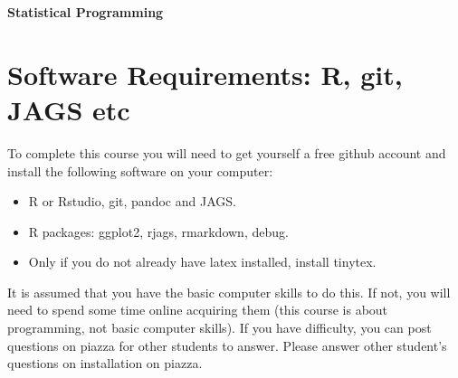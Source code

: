 \documentclass[10pt] {article}
\theoremstyle{definition}
\begin{document}
\centerline{\huge \bf Statistical Programming}

\tableofcontents


\section{Software Requirements: R, git, JAGS etc \label{sec:software}}

To complete this course you will need to get yourself a free github account and install the following software on your computer: 
\begin{itemize}
\item R or Rstudio, git, pandoc and JAGS.
\item R packages: ggplot2, rjags, rmarkdown, debug.
\item Only if you do not already have latex installed, install tinytex. 
\end{itemize}
It is assumed that you have the basic computer skills to do this. If not, you will need to spend some time online acquiring them (this course is about programming, not basic computer skills). If you have difficulty, you can post questions on piazza for other students to answer. Please answer other student's questions on installation on piazza. 
\end{document}
